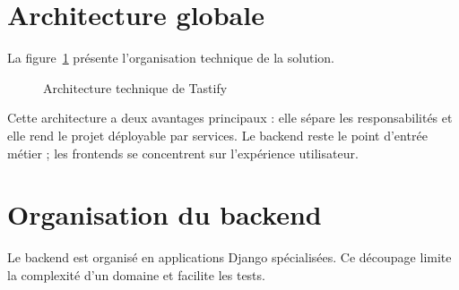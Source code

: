 \section{Architecture globale}
La figure~\ref{fig:architecture-technique} présente l'organisation technique de la solution.

\begin{figure}[H]
\centering
{}
\caption{Architecture technique de Tastify}
\label{fig:architecture-technique}
\end{figure}

Cette architecture a deux avantages principaux : elle sépare les responsabilités et elle rend le projet déployable par services. Le backend reste le point d'entrée métier ; les frontends se concentrent sur l'expérience utilisateur.

\section{Organisation du backend}
Le backend est organisé en applications Django spécialisées. Ce découpage limite la complexité d'un domaine et facilite les tests.

